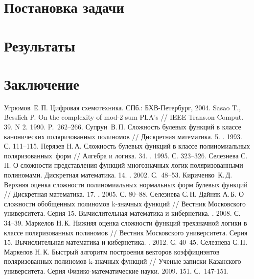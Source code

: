 \documentclass[bibliography=totoc, a4paper, 14pt]{extarticle}
\let\stdsection\section
\renewcommand\section{\newpage\stdsection}
\begin{document}
\newpage
\section{Постановка задачи}

\newpage
\section{Результаты}

\newpage
\section{Заключение}

\makeatletter
\renewcommand*{\@biblabel}[1]{\hfill#1.}
\makeatother

\begin{singlespace}
\begin{thebibliography}{0}
 Угрюмов~Е.\,П. Цифровая схемотехника. СПб.: БХВ-Петербург, 2004.
 Sasao T., Besslich P. On the complexity of mod-2 sum PLA’s  // IEEE Trans.on Comput. 39. N 2. 1990. P.~262--266.
 Супрун~В.\,П. Сложность булевых функций в классе канонических поляризованных полиномов // Дискретная математика. 5.
    . 1993. С. 111--115.
 Перязев Н.\,А. Сложность булевых функций в классе полиномиальных поляризованных~форм // Алгебра и логика. 34.
    . 1995. С. 323--326.
 Селезнева С.\,H. О сложности представления функций многозначных логик поляризованными полиномами. Дискретная
    математика. 14. . 2002. С.~48--53.
 Кириченко~К.\,Д. Верхняя оценка сложности полиномиальных нормальных форм булевых функций
    // Дискретная математика. 17. . 2005. С. 80--88.
 Селезнева С.\,Н. Дайняк А.\,Б. О сложности обобщенных полиномов k\nobreakdash-значных функций // Вестник Московского
    университета. Серия 15. Вычислительная математика и кибернетика. . 2008. С. 34--39.
 Маркелов Н.\,К. Нижняя оценка сложности функций трехзначной логики в классе поляризованных полиномов // Вестник
    Московского университета. Серия 15. Вычислительная математика и кибернетика. . 2012. С. 40--45.
 Селезнева С.\,H. Маркелов Н.\,К. Быстрый алгоритм построения векторов коэффициэнтов поляризованных полиномов
    k-значных функций // Ученые записки Казанского университета. Серия Физико-математические науки. 2009. 151.
     С.~147-151.
\end{thebibliography}

\end{singlespace}
\end{document}

